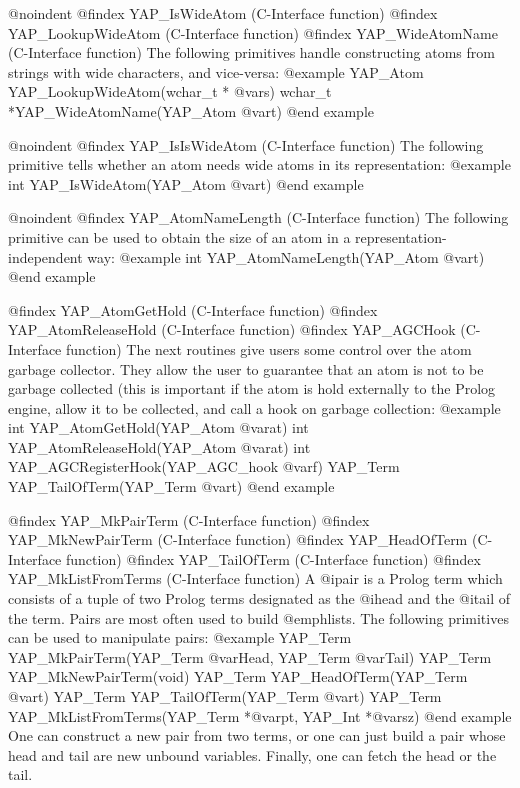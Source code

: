 {{{{{{{{@noindent
@findex YAP_IsWideAtom (C-Interface function)
@findex YAP_LookupWideAtom (C-Interface function)
@findex YAP_WideAtomName (C-Interface function)
The following primitives handle constructing atoms from strings with
wide characters, and vice-versa:
@example
      YAP_Atom  YAP_LookupWideAtom(wchar_t * @var{s})
      wchar_t  *YAP_WideAtomName(YAP_Atom @var{t})
@end example

@noindent
@findex YAP_IsIsWideAtom (C-Interface function)
The following primitive tells whether an atom needs wide atoms in its
representation:
@example
      int  YAP_IsWideAtom(YAP_Atom @var{t})
@end example

@noindent
@findex YAP_AtomNameLength (C-Interface function)
The following primitive can be used to obtain the size of an atom in a
representation-independent way: 
@example
      int      YAP_AtomNameLength(YAP_Atom @var{t})
@end example

@findex YAP_AtomGetHold  (C-Interface function)
@findex YAP_AtomReleaseHold  (C-Interface function)
@findex YAP_AGCHook  (C-Interface function)
The next routines give users some control over  the atom
garbage collector. They allow the user to guarantee that an atom is not
to be garbage collected (this is important if the atom is hold
externally to the Prolog engine, allow it to be collected, and call a
hook on garbage collection:
@example
      int  YAP_AtomGetHold(YAP_Atom @var{at})
      int  YAP_AtomReleaseHold(YAP_Atom @var{at})
      int  YAP_AGCRegisterHook(YAP_AGC_hook @var{f})
      YAP_Term  YAP_TailOfTerm(YAP_Term @var{t})
@end example

@findex YAP_MkPairTerm (C-Interface function)
@findex YAP_MkNewPairTerm (C-Interface function)
@findex YAP_HeadOfTerm (C-Interface function)
@findex YAP_TailOfTerm (C-Interface function)
@findex YAP_MkListFromTerms (C-Interface function)
A @i{pair} is a Prolog term which consists of a tuple of two Prolog
terms designated as the @i{head} and the @i{tail} of the term. Pairs are
most often used to build @emph{lists}. The following primitives can be
used to manipulate pairs:
@example
      YAP_Term  YAP_MkPairTerm(YAP_Term @var{Head}, YAP_Term @var{Tail})
      YAP_Term  YAP_MkNewPairTerm(void)
      YAP_Term  YAP_HeadOfTerm(YAP_Term @var{t})
      YAP_Term  YAP_TailOfTerm(YAP_Term @var{t})
      YAP_Term  YAP_MkListFromTerms(YAP_Term *@var{pt}, YAP_Int *@var{sz})
@end example
One can construct a new pair from two terms, or one can just build a
pair whose head and tail are new unbound variables. Finally, one can
fetch the head or the tail.

}}}}}}}}
